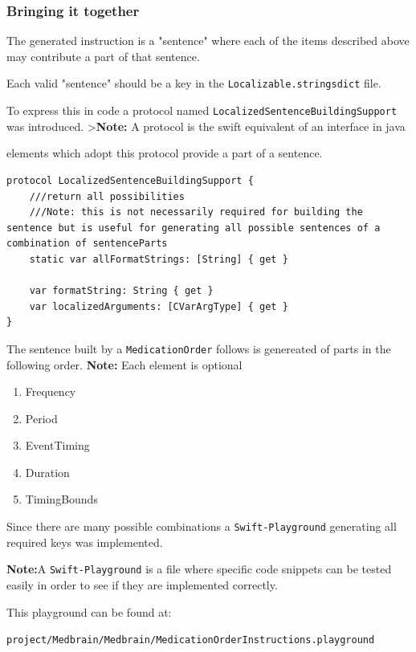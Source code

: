 \documentclass{article}
\begin{document}
\subsubsection{Bringing it together}\label{bringing-it-together}
The generated instruction is a "sentence" where each of the items
described above may contribute a part of that sentence.

Each valid "sentence" should be a key in the
\texttt{Localizable.stringsdict} file.

To express this in code a protocol named
\texttt{LocalizedSentenceBuildingSupport} was introduced.
\textgreater{}\textbf{Note:} A protocol is the swift equivalent of an
interface in java

elements which adopt this protocol provide a part of a sentence.

\begin{verbatim}
protocol LocalizedSentenceBuildingSupport {
    ///return all possibilities
    ///Note: this is not necessarily required for building the sentence but is useful for generating all possible sentences of a combination of sentenceParts
    static var allFormatStrings: [String] { get }

    var formatString: String { get }
    var localizedArguments: [CVarArgType] { get }
}
\end{verbatim}

The sentence built by a \texttt{MedicationOrder} follows is genereated of parts in the following
order. \textbf{Note:} Each element is optional

\begin{enumerate}
\def\labelenumi{\arabic{enumi}.}

\item
  Frequency
\item
  Period
\item
  EventTiming
\item
  Duration
\item
  TimingBounds
\end{enumerate}

Since there are many possible combinations a \texttt{Swift-Playground} generating all required keys was implemented.

\textbf{Note:}A \texttt{Swift-Playground} is a file where specific code
snippets can be tested easily in order to see if they are implemented
correctly.

This playground can be found at:

\texttt{project/Medbrain/Medbrain/MedicationOrderInstructions.playground}
\end{document}
